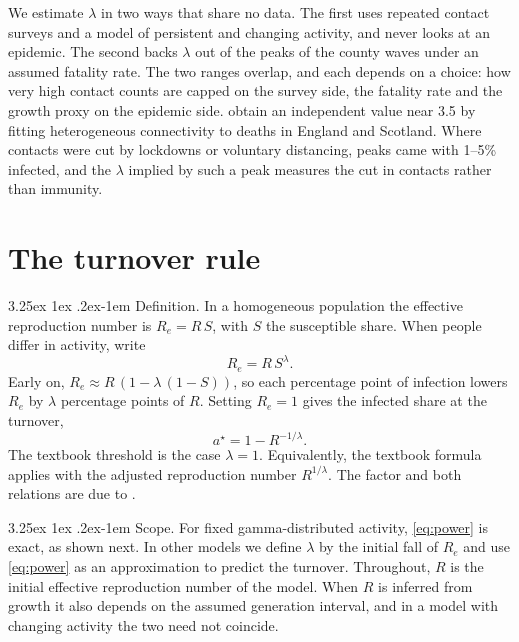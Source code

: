 \documentclass[11pt]{article}
\makeatletter
\renewcommand\paragraph{\@startsection{paragraph}{4}{\z@}%
  {3.25ex \@plus1ex \@minus.2ex}{-1em}%
  {\normalfont\normalsize\itshape}}
\theoremstyle{remark}
\makeatother
\begin{document}
We estimate $\lambda$ in two ways that share no data. The first uses repeated contact surveys and a model of
persistent and changing activity, and never looks at an epidemic. The second backs $\lambda$ out of the peaks of the
county waves under an assumed fatality rate. The two ranges overlap, and each depends on a choice: how very high
contact counts are capped on the survey side, the fatality rate and the growth proxy on the epidemic side.
\citet{gomes2022} obtain an independent value near 3.5 by fitting heterogeneous connectivity to deaths in England and
Scotland. Where contacts were cut by lockdowns or voluntary distancing, peaks came with 1--5\% infected, and the
$\lambda$ implied by such a peak measures the cut in contacts rather than immunity.

\section{The turnover rule}

\paragraph{Definition.} In a homogeneous population the effective reproduction number is $R_e = R\,S$, with $S$ the
susceptible share. When people differ in activity, write
\begin{equation}\label{eq:power}
  R_e = R\,S^{\lambda}.
\end{equation}
Early on, $R_e \approx R\,(1 - \lambda\,(1 - S))$, so each percentage point of infection lowers $R_e$ by $\lambda$
percentage points of $R$. Setting $R_e = 1$ gives the infected share at the turnover,
\begin{equation}\label{eq:rule}
  a^\star = 1 - R^{-1/\lambda}.
\end{equation}
The textbook threshold is the case $\lambda = 1$. Equivalently, the textbook formula applies with the adjusted
reproduction number $R^{1/\lambda}$. The factor and both relations are due to \citet[eqs.~9, 14, 15]{tkachenko2021}.

\paragraph{Scope.} For fixed gamma-distributed activity, \eqref{eq:power} is exact, as shown next. In other models we
define $\lambda$ by the initial fall of $R_e$ and use \eqref{eq:power} as an approximation to predict the turnover.
Throughout, $R$ is the initial effective reproduction number of the model. When $R$ is inferred from growth it also
depends on the assumed generation interval, and in a model with changing activity the two need not coincide.
\end{document}

